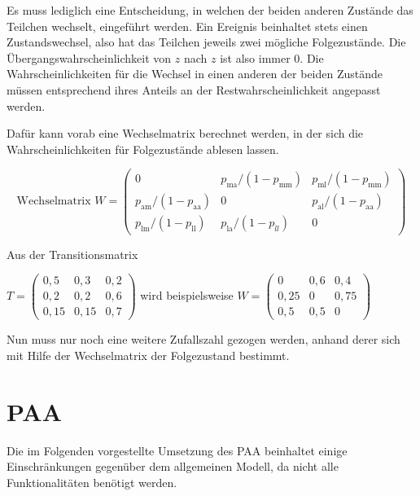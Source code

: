 Es muss lediglich eine Entscheidung, in welchen der beiden anderen Zustände das Teilchen wechselt, eingeführt werden. Ein Ereignis beinhaltet stets einen Zustandswechsel, also hat das Teilchen jeweils zwei mögliche Folgezustände. Die Übergangswahrscheinlichkeit von $z$ nach $z$ ist also immer $0$. Die Wahrscheinlichkeiten für die Wechsel in einen anderen der beiden Zustände müssen entsprechend ihres Anteils an der Restwahrscheinlichkeit angepasst werden.

Dafür kann vorab eine Wechselmatrix berechnet werden, in der sich die Wahrscheinlichkeiten für Folgezustände ablesen lassen.

\begin{equation}
\text{Wechselmatrix } W = 
\begin{pmatrix}
0 &  p_{\text{ma}}/(1-p_{\text{mm}}) & p_{\text{ml}}/(1-p_{\text{mm}}) \\
p_{\text{am}}/(1- p_{\text{aa}}) & 0 & p_{\text{al}}/(1- p_{\text{aa}}) \\
p_{\text{lm}}/(1-p_{\text{ll}}) &  p_{\text{la}}/(1-p_{ll}) & 0 
\end{pmatrix}  
\end{equation}

Aus der Transitionsmatrix

$T= 
\begin{pmatrix}
0,5 & 0,3 & 0,2 \\
0,2 & 0,2 & 0,6 \\
0,15 & 0,15 & 0,7 
\end{pmatrix}
$  
wird beispielsweise  
$W= 
\begin{pmatrix}
0 & 0,6 & 0,4 \\
0,25 & 0 & 0,75 \\
0,5 & 0,5 & 0 
\end{pmatrix}
$  

Nun muss nur noch eine weitere Zufallszahl gezogen werden, anhand derer sich mit Hilfe der Wechselmatrix der Folgezustand bestimmt.


\section{PAA}

Die im Folgenden vorgestellte Umsetzung des PAA beinhaltet einige Einschränkungen gegenüber dem allgemeinen Modell, da nicht alle Funktionalitäten benötigt werden.

